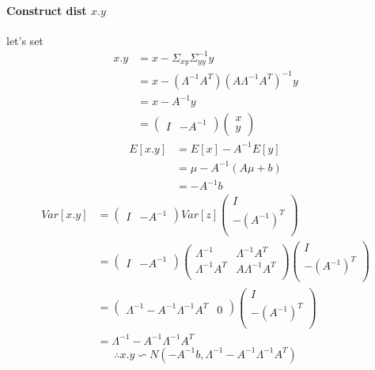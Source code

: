 \documentclass{report}
\begin{document}
\paragraph{Construct dist $x.y$\\}
let's set 
$$
\begin{aligned}
x.y 
&= x - \Sigma_{xy} \Sigma_{yy}^{-1}y\\
&= x - (\Lambda^{-1} A^T)(A \Lambda^{-1}A^T)^{-1}y\\
&= x - A^{-1}y\\
&= 
\left ( \begin{matrix}
I& -A^{-1}
\end{matrix} \right )
\left ( \begin{matrix}
x\\
y
\end{matrix} \right )
\end{aligned}
$$
$$
\begin{aligned}
E[x.y] 
&= E[x] - A^{-1} E[y]\\
&= \mu - A^{-1}(A\mu+b)\\
&= -A^{-1}b
\end{aligned}
$$
$$
\begin{aligned}
Var[x.y]
&= 
\left ( \begin{matrix}
I& -A^{-1}
\end{matrix} \right )
Var[z]
\left ( \begin{matrix}
I\\
-(A^{-1})^T\\
\end{matrix} \right )\\
&= 
\left ( \begin{matrix}
I& -A^{-1}
\end{matrix} \right )
\left (
\begin{matrix}
\Lambda^{-1}&\Lambda^{-1}A^T\\
\Lambda^{-1}A^T&A\Lambda^{-1} A^T\\
\end{matrix}
\right )
\left ( \begin{matrix}
I\\
-(A^{-1})^T\\
\end{matrix} \right )\\
&=
\left ( \begin{matrix}
\Lambda^{-1}-A^{-1} \Lambda^{-1}A^T & 0
\end{matrix} \right )
\left ( \begin{matrix}
I\\
-(A^{-1})^T\\
\end{matrix} \right )\\
&=\Lambda^{-1}-A^{-1} \Lambda^{-1}A^T
\end{aligned}
$$
$$
\therefore x.y \backsim N(-A^{-1}b, \Lambda^{-1}-A^{-1} \Lambda^{-1}A^T)
$$
\end{document}
